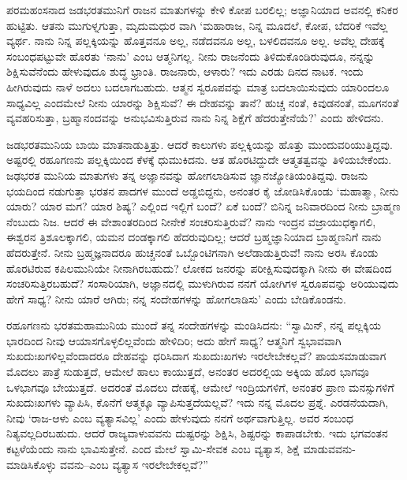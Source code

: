ಪರಮಹಂಸನಾದ ಜಡಭರತಮುನಿಗೆ ರಾಜನ ಮಾತುಗಳನ್ನು ಕೇಳಿ ಕೋಪ ಬರಲಿಲ್ಲ; ಅಜ್ಞಾನಿಯಾದ ಅವನಲ್ಲಿ ಕನಿಕರ ಹುಟ್ಟಿತು. ಆತನು ಮುಗುಳ್ನಗುತ್ತಾ, ಮೃದುಮಧುರ ವಾಗಿ ‘ಮಹಾರಾಜ, ನಿನ್ನ ಮೂದಲೆ, ಕೋಪ, ಬೆದರಿಕೆ ಇವೆಲ್ಲ ವ್ಯರ್ಥ. ನಾನು ನಿನ್ನ ಪಲ್ಲಕ್ಕಿಯನ್ನು ಹೊತ್ತವನೂ ಅಲ್ಲ, ನಡೆದವನೂ ಅಲ್ಲ, ಬಳಲಿದವನೂ ಅಲ್ಲ. ಅವೆಲ್ಲ ದೇಹಕ್ಕೆ ಸಂಬಂಧಪಟ್ಟುವೇ ಹೊರತು ‘ನಾನು’ ಎಂಬ ಆತ್ಮನಿಗಲ್ಲ. ನೀನು ರಾಜನೆಂದು ತಿಳಿದುಕೊಂಡಿರುವುದೂ, ನನ್ನನ್ನು ಶಿಕ್ಷಿಸುವೆನೆಂದು ಹೇಳುವುದೂ ಶುದ್ಧ ಭ್ರಾಂತಿ. ರಾಜನಾರು, ಆಳಾರು? ಇದು ಎರಡು ದಿನದ ನಾಟಕ. ಇಂದು ಹೀಗಿರುವುದು ನಾಳೆ ಅದಲು ಬದಲಾಗಬಹುದು. ಆತ್ಮನ ಸ್ವರೂಪವನ್ನು ಮಾತ್ರ ಬದಲಾಯಿಸುವುದು ಯಾರಿಂದಲೂ ಸಾಧ್ಯವಿಲ್ಲ ಎಂದಮೇಲೆ ನೀನು ಯಾರನ್ನು ಶಿಕ್ಷಿಸುವೆ? ಈ ದೇಹವನ್ನು ತಾನೆ? ಹುಚ್ಚ ನಂತೆ, ಕಿವುಡನಂತೆ, ಮೂಗನಂತೆ ವ್ಯವಹರಿಸುತ್ತಾ, ಬ್ರಹ್ಮಾನಂದವನ್ನು ಅನುಭವಿಸುತ್ತಿರುವ ನಾನು ನಿನ್ನ ಶಿಕ್ಷೆಗೆ ಹೆದರುತ್ತೇನೆಯೆ?’ ಎಂದು ಹೇಳಿದನು.

ಜಡಭರತಮುನಿಯ ಬಾಯಿ ಮಾತನಾಡುತ್ತಿತ್ತು. ಆದರೆ ಕಾಲುಗಳು ಪಲ್ಲಕ್ಕಿಯನ್ನು ಹೊತ್ತು ಮುಂದುವರಿಯುತ್ತಿದ್ದವು. ಅಷ್ಟರಲ್ಲಿ ರಹೂಗಣನು ಪಲ್ಲಕ್ಕಿಯಿಂದ ಕೆಳಕ್ಕೆ ಧುಮುಕಿದನು. ಆತ ಹೊರಟಿದ್ದುದೇ ಆತ್ಮತತ್ವವನ್ನು ತಿಳಿಯಬೇಕೆಂದು. ಜಢಭರತ ಮುನಿಯ ಮಾತುಗಳು ತನ್ನ ಅಜ್ಞಾನವನ್ನು ಹೋಗಲಾಡಿಸುವ ಜ್ಞಾನಜ್ಯೋತಿಯಂತಿದ್ದವು. ರಾಜನು ಭಯದಿಂದ ನಡುಗುತ್ತಾ ಭರತನ ಪಾದಗಳ ಮುಂದೆ ಅಡ್ಡಬಿದ್ದನು, ಅನಂತರ ಕೈ ಜೋಡಿಸಿಕೊಂಡು ‘ಮಹಾತ್ಮಾ, ನೀನು ಯಾರು? ಯಾರ ಮಗ? ಯಾರ ಶಿಷ್ಯ? ಎಲ್ಲಿಂದ ಇಲ್ಲಿಗೆ ಬಂದೆ? ಏಕೆ ಬಂದೆ? ಬಿನಿನ್ನ ಜನಿವಾರದಿಂದ ನೀನು ಬ್ರಾಹ್ಮಣ ನೆಂಬುದು ನಿಜ. ಆದರೆ ಈ ವೇಶಾಂತರದಿಂದ ನೀನೇಕೆ ಸಂಚರಿಸುತ್ತಿರುವೆ? ನಾನು ಇಂದ್ರನ ವಜ್ರಾಯುಧಕ್ಕಾಗಲಿ, ಈಶ್ವರನ ತ್ರಿಶೂಲಕ್ಕಾಗಲಿ, ಯಮನ ದಂಡಕ್ಕಾಗಲಿ ಹೆದರುವುದಿಲ್ಲ; ಆದರೆ ಬ್ರಹ್ಮಜ್ಞಾನಿಯಾದ ಬ್ರಾಹ್ಮಣನಿಗೆ ನಾನು ಹೆದರುತ್ತೇನೆ. ನೀನು ಬ್ರಹ್ಮಜ್ಞನಾದರೂ ಹುಚ್ಚನಂತೆ ಒಬ್ಬೊಂಟಿಗನಾಗಿ ಅಲೆಡಾಡುತ್ತಿರುವೆ! ನಾನು ಅರಸಿ ಕೊಂಡು ಹೊರಟಿರುವ ಕಪಿಲಮುನಿಯೇ ನೀನಾಗಿರಬಹುದು? ಲೋಕದ ಜನರನ್ನು ಪರೀಕ್ಷಿಸುವುದಕ್ಕಾಗಿ ನೀನು ಈ ವೇಷದಿಂದ ಸಂಚರಿಸುತ್ತಿರಬಹುದೆ? ಸಂಸಾರಿಯಾಗಿ, ಅಜ್ಞಾನದಲ್ಲಿ ಮುಳುಗಿರುವ ನನಗೆ ಯೋಗಿಗಳ ಸ್ವರೂಪವನ್ನು ಅರಿಯುವುದು ಹೇಗೆ ಸಾಧ್ಯ? ನೀನು ಯಾರೆ ಆಗಿರು; ನನ್ನ ಸಂದೇಹಗಳನ್ನು ಹೋಗಲಾಡಿಸು’ ಎಂದು ಬೇಡಿಕೊಂಡನು.

ರಹೂಗಣನು ಭರತಮಹಾಮುನಿಯ ಮುಂದೆ ತನ್ನ ಸಂದೇಹಗಳನ್ನು ಮಂಡಿಸಿದನು: “ಸ್ವಾಮಿನ್, ನನ್ನ ಪಲ್ಲಕ್ಕಿಯ ಭಾರದಿಂದ ನೀವು ಆಯಾಸಗೊಳ್ಳಲಿಲ್ಲವೆಂದು ಹೇಳಿದಿರಿ; ಅದು ಹೇಗೆ ಸಾಧ್ಯ? ಆತ್ಮನಿಗೆ ಸ್ವಭಾವವಾಗಿ ಸುಖದುಃಖಗಳಿಲ್ಲವೆಂದಾದರೂ ದೇಹವನ್ನು ಧರಿಸಿದಾಗ ಸುಖದುಃಖಗಳು ಇರಲೇಬೇಕಲ್ಲವೆ? ಪಾಯಸಮಾಡುವಾಗ ಮೊದಲು ಪಾತ್ರೆ ಸುಡುತ್ತದೆ, ಆಮೇಲೆ ಹಾಲು ಕಾಯುತ್ತದೆ, ಅನಂತರ ಅದರಲ್ಲಿಯ ಅಕ್ಕಿಯ ಹೊರ ಭಾಗವೂ ಒಳಭಾಗವೂ ಬೇಯುತ್ತದೆ. ಅದರಂತೆ ಮೊದಲು ದೇಹಕ್ಕೆ, ಆಮೇಲೆ ಇಂದ್ರಿಯಗಳಿಗೆ, ಅನಂತರ ಪ್ರಾಣ ಮನಸ್ಸುಗಳಿಗೆ ಸುಖದುಃಖಗಳು ವ್ಯಾಪಿಸಿ, ಕೊನೆಗೆ ಆತ್ಮಕ್ಕೂ ವ್ಯಾಪಿಸುತ್ತದೆಯಲ್ಲವೆ? ಇದು ನನ್ನ ಮೊದಲ ಪ್ರಶ್ನೆ. ಎರಡನೆಯದಾಗಿ, ನೀವು ‘ರಾಜ-ಆಳು ಎಂಬ ವ್ಯತ್ಯಾಸವಿಲ್ಲ’ ಎಂದು ಹೇಳುವುದು ನನಗೆ ಅರ್ಥವಾಗುತ್ತಿಲ್ಲ. ಅವರ ಸಂಬಂಧ ನಿತ್ಯವಲ್ಲದಿರಬಹುದು. ಆದರೆ ರಾಜ್ಯವಾಳುವವನು ದುಷ್ಟರನ್ನು ಶಿಕ್ಷಿಸಿ, ಶಿಷ್ಟರನ್ನು ಕಾಪಾಡಬೇಕು. ಇದು ಭಗವಂತನ ಕಟ್ಟಳೆಯೆಂದು ನಾನು ಭಾವಿಸುತ್ತೇನೆ. ಎಂದ ಮೇಲೆ ಸ್ವಾಮಿ-ಸೇವಕ ಎಂಬ ವ್ಯತ್ಯಾಸ, ಶಿಕ್ಷೆ ಮಾಡುವವನು-ಮಾಡಿಸಿಕೊಳ್ಳು ವವನು–ಎಂಬ ವ್ಯತ್ಯಾಸ ಇರಲೇಬೇಕಲ್ಲವೆ?”

